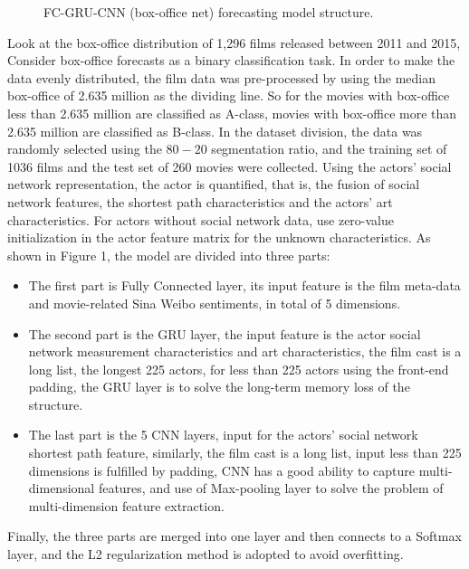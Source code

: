 \documentclass[review]{cvpr}
\begin{document}
\begin{figure*}
\begin{center}
\end{center}
   \caption{FC-GRU-CNN (box-office net) forecasting model structure.}
\label{fig:short}
\end{figure*}

Look at the box-office distribution of 1,296 films released between 2011 and 2015,
Consider box-office forecasts as a binary classification task.
In order to make the data evenly distributed, the film data was pre-processed by using the median box-office of 2.635 million as the dividing line.
So for the movies with box-office less than 2.635 million are classified as A-class, movies with box-office more than 2.635 million are classified as B-class.
In the dataset division, the data was randomly selected using the $80-20$ segmentation ratio, and the training set of 1036 films and the test set of 260 movies were collected.
Using the actors' social network representation, the actor is quantified, that is, 
the fusion of social network features, the shortest path characteristics and the actors' art characteristics.
For actors without social network data, use zero-value initialization in the actor feature matrix for the unknown characteristics.
As shown in Figure 1, the model are divided into three parts:

\begin{itemize}
\item The first part is Fully Connected layer, its input feature is the film meta-data and movie-related Sina Weibo sentiments, in total of 5 dimensions.
\item The second part is the GRU layer, the input feature is the actor social network measurement characteristics and art characteristics, the film cast is a long list,
the longest 225 actors, for less than 225 actors using the front-end padding, the GRU layer is to solve the long-term memory loss of the structure.
\item The last part is the 5 CNN layers, input for the actors' social network shortest path feature, similarly, the film cast is a long list,
input less than 225 dimensions is fulfilled by padding, CNN has a good ability to capture multi-dimensional features, and use of Max-pooling layer to solve the problem of multi-dimension feature extraction.
\end{itemize}
Finally, the three parts are merged into one layer and then connects to a Softmax layer, and the L2 regularization method is adopted to avoid overfitting.
\end{document}
